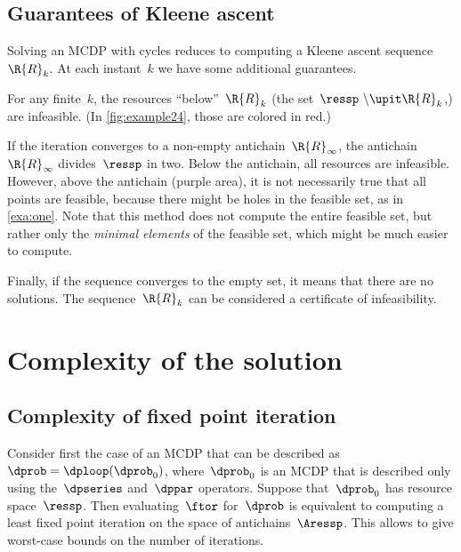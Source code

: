 \subsection{Guarantees of Kleene ascent}

\noindent Solving an MCDP with cycles reduces to computing a Kleene
ascent sequence~$\R{R}_{k}.$ At each instant~$k$ we have some
additional guarantees.

For any finite~$k$, the resources ``below''~$\R{R}_{k}$ (the
set~$\ressp\ \backslash\upit\R{R}_{k}$,) are infeasible. (In \cref{fig:example24},
those are colored in red.)

If the iteration converges to a non-empty antichain~$\R{R}_{\infty}$,
the antichain~$\R{R}_{\infty}$ divides~$\ressp$ in two. Below
the antichain, all resources are infeasible. However, above the antichain
(purple area), it is not necessarily true that all points are feasible,
because there might be holes in the feasible set, as in \cref{exa:one}.
Note that this method does not compute the entire feasible set, but
rather only the \emph{minimal elements} of the feasible set, which
might be much easier to compute.

Finally, if the sequence converges to the empty set, it means that
there are no solutions. The sequence~$\R{R}_{k}$ can be considered
a certificate of infeasibility.


\section{Complexity of the solution}

\subsection{Complexity of fixed point iteration}

Consider first the case of an MCDP that can be described as~$\dprob=\dploop(\dprob_{0})$,
where~$\dprob_{0}$ is an MCDP that is described only using the~$\dpseries$
and~$\dppar$ operators. Suppose that~$\dprob_{0}$ has resource
space~$\ressp$. Then evaluating~$\ftor$ for~$\dprob$ is equivalent
to computing a least fixed point iteration on the space of antichains~$\Aressp$.
This allows to give worst-case bounds on the number of iterations.

